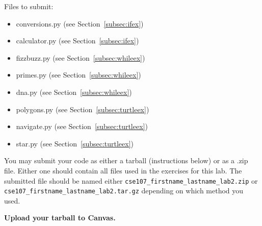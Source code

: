 \documentclass[11pt]{cselabheader}
\begin{document}
Files to submit:
\begin{itemize}
  \item conversions.py (see Section~\ref{subsec:ifex})
  \item calculator.py (see Section~\ref{subsec:ifex})
  \item fizzbuzz.py (see Section~\ref{subsec:whileex})
  \item primes.py (see Section~\ref{subsec:whileex})
  \item dna.py (see Section~\ref{subsec:whileex})
  \item polygons.py (see Section~\ref{subsec:turtleex})
  \item navigate.py (see Section~\ref{subsec:turtleex})
  \item star.py (see Section~\ref{subsec:turtleex})
\end{itemize}

You may submit your code as either a tarball (instructions below) or as a .zip
file. Either one should contain all files used in the exercises for this lab.
The submitted file should be named either
\texttt{cse107\_firstname\_lastname\_lab2.zip} or
\texttt{cse107\_firstname\_lastname\_lab2.tar.gz} depending on which method you
used.

\begin{center}
  \textbf{Upload your tarball to Canvas.}
\end{center}
\end{document}
